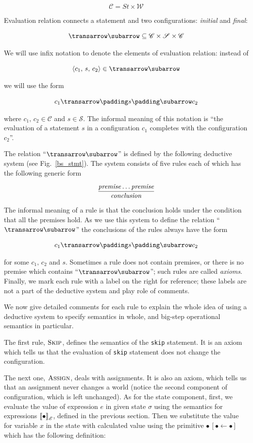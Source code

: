 \[
\mathscr{C} = St \times \mathscr W
\]

Evaluation relation connects a statement and two configurations: \emph{initial} and \emph{final}:

\[
\transrel\subseteq \mathscr{C}\times\mathscr{S}\times\mathscr{C}
\]

We will use infix notation to denote the elements of evaluation relation: instead of 

\[
\inbr{c_1,\,s,\,c_2}\in\transrel
\]

we will use the form


\[
\trans{c_1}{s}{c_2}
\]


where $c_1,\,c_2\in\mathscr{C}$ and $s\in\mathscr{S}$. The informal meaning of this notation is
``the evaluation of a statement $s$ in a configuration $c_1$ completes with the configuration $c_2$''.

The relation ``$\transrel$'' is defined by the following deductive system (see Fig.~\ref{bs_stmt}). The system
consists of five rules each of which has the following generic form

\[
\dfrac{\mbox{\emph{premise}}\dots\mbox{\emph{premise}}}{\mbox{\emph{conclusion}}}
\]

The informal meaning of a rule is that the conclusion holds under the condition that all the premises hold. As
we use this system to define the relation ``$\transrel$'' the conclusions of the rules always have
the form

\[
\trans{c_1}{s}{c_2}
\]

for some $c_1,\,c_2$ and $s$. Sometimes a rule does not contain premises, or there is no premise which
contains ``$\transrel$''; such rules are called \emph{axioms}. Finally, we mark each rule with
a label on the right for reference; these labels are not a part of the deductive system and play
role of comments.

We now give detailed comments for each rule to explain the whole idea of using a deductive system to
specify semantics in whole, and big-step operational semantics in particular.

The first rule, $\textsc{Skip}$, defines the semantics of the \lstinline|skip| statement. It is an
axiom which tells us that the evaluation of \lstinline|skip| statement does not change the configuration.

The next one, $\textsc{Assign}$, deals with assignments. It is also an axiom, which tells us that an
assignment never changes a world (notice the second component of configuration, which is left unchanged).
As for the state component, first, we evaluate the value of expression $e$ in given state $\sigma$ using
the semantics for expressions $\sembr{\bullet}^\ph_\mathscr{E}$, defined in the previous section. Then we
substitute the value for variable $x$ in the state with calculated value using the primitive $\bullet\,[\bullet\gets \bullet]$
which has the following definition:

